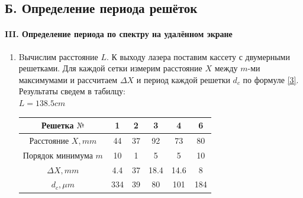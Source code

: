 \documentclass[12pt]{article}
\begin{document}
\newpage

\subsection*{Б. Определение периода решёток}

\paragraph{III. Определение периода по спектру на удалённом экране}
\begin{enumerate}
    \item Bычислим расстояние $L$. К выходу лазера поставим кассету с двумерными решетками. Для каждой сетки измерим расстояние $X$ между $m$-ми максимумами и рассчитаем $\Delta X$ и период каждой решетки $d_c$ по формуле \ref{3}. Результаты сведем в табилцу: \\
    $L = 138.5 cm$ \\
    \begin{tabu} to 1\textwidth{|c|c|c|c|c|c|}
    \hline
    Решетка $№$ & 1 & 2 & 3 & 4 &  6 \\
    \hline
    Расстояние $X, mm$ & 44 & 37 & 92 & 73 & 80 \\
    \hline
    Порядок минимума $m$ & 10 & 1 & 5 & 5 & 10 \\
    \hline
    $\Delta X, mm$ & 4.4 & 37 & 18.4 & 14.6 & 8 \\
    \hline
    $d_c, \mu m$ & 334 & 39 & 80 & 101 & 184 \\
    \hline
    \end{tabu}
        
\end{enumerate}
    
\end{document}
